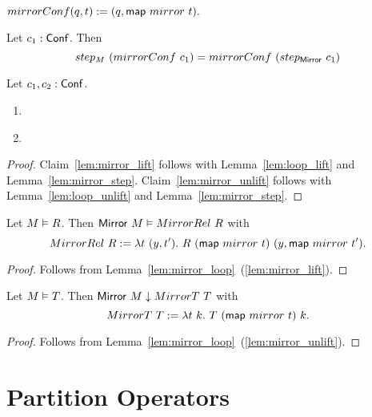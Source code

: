 \begin{definition}
  \label{def:mirrorConf}
  $mirrorConf(q,t) := (q, \mathsf{map}~mirror~t).$
\end{definition}


\begin{lemma}
  \label{lem:mirror_step}
  Let $c_1 : \mathsf{Conf}$.  Then
  \[ step_M~(mirrorConf~c_1) = mirrorConf~(step_{\mathsf{Mirror}}~c_1) \]
\end{lemma}

\begin{lemma}
  \label{lem:mirror_loop}
  Let $c_1, c_2 : \mathsf{Conf}$.
  \begin{enumerate}
  \item \label{lem:mirror_lift}
  \item \label{lem:mirror_unlift}
  \end{enumerate}
\end{lemma}
\begin{proof}
  Claim~\ref{lem:mirror_lift} follows with Lemma~\ref{lem:loop_lift} and Lemma~\ref{lem:mirror_step}.  Claim~\ref{lem:mirror_unlift} follows with
  Lemma~\ref{lem:loop_unlift} and Lemma~\ref{lem:mirror_step}.
\end{proof}

\begin{lemma}
  Let $M \mathrel{\vDash} R$.  Then $\mathsf{Mirror}~M \mathrel{\vDash} MirrorRel~R$ with
  \[
    MirrorRel~R := \lambda t~(y, t').~ R~(\mathsf{map}~mirror~t)~(y, \mathsf{map}~mirror~t').
  \]
\end{lemma}
\begin{proof}
  Follows from Lemma~\ref{lem:mirror_loop}~(\ref{lem:mirror_lift}).
\end{proof}
\begin{lemma}
  Let $M \mathrel{\vDash} T$.  Then $\mathsf{Mirror}~M \mathrel{\downarrow} MirrorT~T$ with
  \[
    MirrorT~T := \lambda t~k.~ T~(\mathsf{map}~mirror~t)~k.
  \]
\end{lemma}
\begin{proof}
  Follows from Lemma~\ref{lem:mirror_loop}~(\ref{lem:mirror_unlift}).
\end{proof}

\section{Partition Operators}
\label{sec:partition-op}
%

